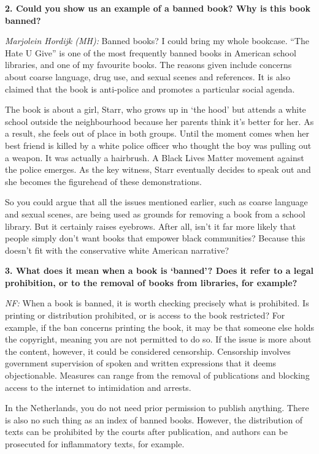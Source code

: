 \documentclass[a4paper,
fontsize=11pt,
oneside,
numbers=noperiodatend,
parskip=half-,
bibliography=totoc,
final
]{scrartcl}
\begin{document}
\textbf{2. Could you show us an example of a banned book? Why is this
book banned?}

\emph{Marjolein Hordijk (MH):} Banned books? I could bring my whole
bookcase. \enquote{The Hate U Give} is one of the most frequently banned
books in American school libraries, and one of my favourite books. The
reasons given include concerns about coarse language, drug use, and
sexual scenes and references. It is also claimed that the book is
anti-police and promotes a particular social agenda.

The book is about a girl, Starr, who grows up in \enquote*{the hood} but
attends a white school outside the neighbourhood because her parents
think it's better for her. As a result, she feels out of place in both
groups. Until the moment comes when her best friend is killed by a white
police officer who thought the boy was pulling out a weapon. It was
actually a hairbrush. A Black Lives Matter movement against the police
emerges. As the key witness, Starr eventually decides to speak out and
she becomes the figurehead of these demonstrations.

So you could argue that all the issues mentioned earlier, such as coarse
language and sexual scenes, are being used as grounds for removing a
book from a school library. But it certainly raises eyebrows. After all,
isn't it far more likely that people simply don't want books that
empower black communities? Because this doesn't fit with the
conservative white American narrative?

\textbf{3. What does it mean when a book is
\enquote*{banned}? Does it refer to a legal
prohibition, or to the removal of books from libraries, for example?}

\emph{NF:} When a book is banned, it is worth checking precisely what is
prohibited. Is printing or distribution prohibited, or is access to the
book restricted? For example, if the ban concerns printing the book, it
may be that someone else holds the copyright, meaning you are not
permitted to do so. If the issue is more about the content, however, it
could be considered censorship. Censorship involves government
supervision of spoken and written expressions that it deems
objectionable. Measures can range from the removal of publications and
blocking access to the internet to intimidation and arrests.

In the Netherlands, you do not need prior permission to publish
anything. There is also no such thing as an index of banned books.
However, the distribution of texts can be prohibited by the courts after
publication, and authors can be prosecuted for inflammatory texts, for
example.
\end{document}
